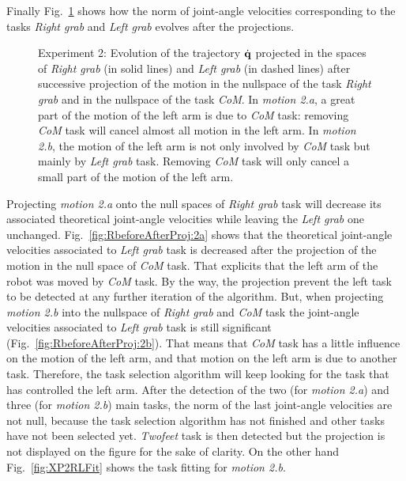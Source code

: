 \documentclass[journal]{IEEEtran}
\begin{document}
Finally Fig.~\ref{fig:RbeforeAfterProj} shows how the norm of joint-angle velocities corresponding to the tasks
\emph{Right grab} and \emph{Left grab} evolves after the projections.
\begin{figure}[p]
\centering
  \subfigure[Motion 2.a]{
  \resizebox{.46\textwidth}{!} {
      
    }
  \label{fig:RbeforeAfterProj:2a}
  }
  \subfigure[Motion 2.b]{
  \resizebox{.46\textwidth}{!} {
      
  }
  \label{fig:RbeforeAfterProj:2b}
  }
  \caption{Experiment 2: Evolution of the trajectory $\dot{{\mathbf{q}}}$ projected in the spaces of
  \emph{Right grab} (in solid lines) and
  \emph{Left grab} (in dashed lines) after
  successive projection of the motion in the nullspace of the task \emph{Right grab} and in the nullspace
  of the task \emph{CoM}. In \emph{motion 2.a}, a great part of the motion of the left arm is due to
  \emph{CoM} task: removing \emph{CoM} task will cancel almost all motion in the left arm.
  In \emph{motion 2.b}, the motion of the left arm is not only involved by \emph{CoM} task
  but mainly by \emph{Left grab} task. Removing \emph{CoM} task will only
  cancel a small part of the motion of the left arm.}
\label{fig:RbeforeAfterProj}
\end{figure}
Projecting \emph{motion 2.a} onto the null spaces of
\emph{Right grab} task will decrease its associated theoretical joint-angle velocities while leaving the
\emph{Left grab} one unchanged. Fig.~\ref{fig:RbeforeAfterProj:2a} shows
that the theoretical joint-angle velocities associated to
\emph{Left grab} task is decreased after the projection of the motion in
the null space of \emph{CoM} task.  That explicits that
the left arm of the robot was moved by \emph{CoM} task.
By the way, the projection prevent the left task to be detected at any further iteration of
the algorithm.
But, when projecting \emph{motion 2.b} into the nullspace of \emph{Right grab}
and \emph{CoM} task the joint-angle velocities associated to \emph{Left grab} task
is still significant (Fig.~\ref{fig:RbeforeAfterProj:2b}). That means that
\emph{CoM} task has a little influence on the
motion of the left arm, and that motion on the left arm is due
to another task. Therefore, the task selection algorithm will keep looking
for the task that has controlled the left arm.
After the detection of the two (for \emph{motion 2.a}) and three (for \emph{motion 2.b}) main tasks,
the norm of the last joint-angle velocities are not null, because
the task selection algorithm has not finished and other tasks have not been selected yet.
\emph{Twofeet} task is then detected but the projection is not displayed on the figure for the sake of clarity.
On the other hand Fig.~\ref{fig:XP2RLFit} shows the task fitting for \emph{motion 2.b}.
\end{document}

